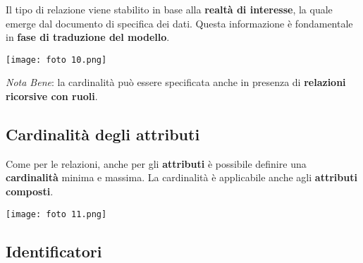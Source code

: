 \documentclass{article}
\begin{document}
Il tipo di relazione viene stabilito in base alla \textbf{realtà di interesse}, la quale emerge dal documento di specifica dei dati. Questa informazione è fondamentale in \textbf{fase di traduzione del modello}.\\
\begin{center}
    \texttt{[image: foto 10.png]}
\end{center}
\textit{Nota Bene}: la cardinalità può essere specificata anche in presenza di \textbf{relazioni ricorsive con ruoli}.

\subsection*{Cardinalità degli attributi}
\large

Come per le relazioni, anche per gli \textbf{attributi} è possibile definire una \textbf{cardinalità} minima e massima. La cardinalità è applicabile anche agli \textbf{attributi composti}.
\begin{center}
    \texttt{[image: foto 11.png]}
\end{center}

\subsection*{Identificatori}
\large
\end{document}
